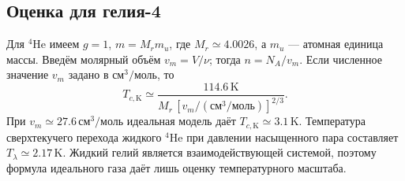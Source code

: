 \documentclass[../final.tex]{subfiles}
\begin{document}
\subsection{Оценка для гелия-4}
Для $^4\mathrm{He}$ имеем $g=1$, $m=M_r m_u$,
где $M_r\simeq4.0026$, а $m_u$ --- атомная единица массы.
Введём молярный объём $v_m=V/\nu$; тогда $n=N_A/v_m$.
Если численное значение $v_m$ задано в $\text{см}^3/\text{моль}$, то
\begin{equation*}
 T_{c,\mathrm K}\simeq
 \frac{114.6\,\mathrm K}
 {M_r\,[v_m/(\text{см}^3/\text{моль})]^{2/3}}.
\end{equation*}
При $v_m\simeq27.6\,\text{см}^3/\text{моль}$ идеальная модель даёт
$T_{c,\mathrm K}\simeq3.1\,\mathrm K$.
Температура сверхтекучего перехода жидкого $^4\mathrm{He}$ при давлении
насыщенного пара составляет $T_\lambda\simeq2.17\,\mathrm K$.
Жидкий гелий является взаимодействующей системой, поэтому формула идеального
газа даёт лишь оценку температурного масштаба.
\end{document}
